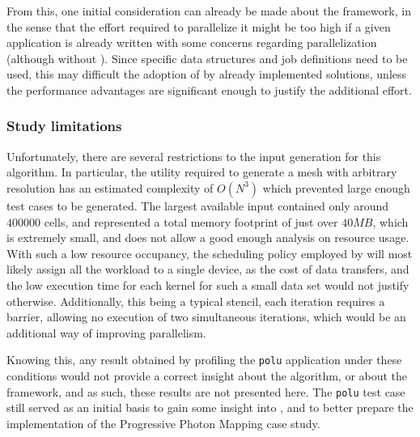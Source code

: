 \documentclass[main.tex]{subfiles}
\begin{document}
From this, one initial consideration can already be made about the framework, in the sense that the effort required to parallelize it might be too high if a given application is already written with some concerns regarding parallelization (although without \gama). Since specific data structures and job definitions need to be used, this may difficult the adoption of \gama by already implemented solutions, unless the performance advantages are significant enough to justify the additional effort.


\subsubsection{Study limitations}

Unfortunately, there are several restrictions to the input generation for this algorithm. In particular, the utility required to generate a mesh with arbitrary resolution has an estimated complexity of $O(N^3)$ which prevented large enough test cases to be generated. The largest available input contained only around $400000$ cells, and represented a total memory footprint of just over $40MB$, which is extremely small, and does not allow a good enough analysis on resource usage. With such a low resource occupancy, the scheduling policy employed by \gama will most likely assign all the workload to a single device, as the cost of data transfers, and the low execution time for each kernel for such a small data set would not justify otherwise. Additionally, this being a typical stencil, each iteration requires a barrier, allowing no execution of two simultaneous iterations, which would be an additional way of improving parallelism.

Knowing this, any result obtained by profiling the \texttt{polu} application under these conditions would not provide a correct insight about the algorithm, or about the framework, and as such, these results are not presented here.
The \texttt{polu} test case still served as an initial basis to gain some insight into \gama, and to better prepare the implementation of the Progressive Photon Mapping case study.
\end{document}
